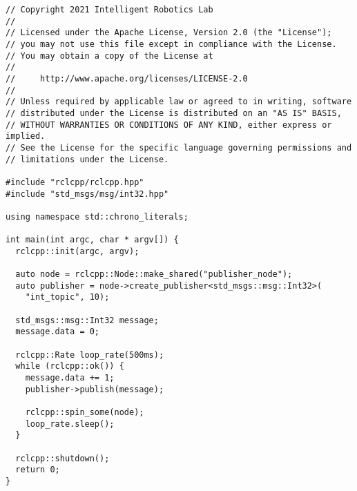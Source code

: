  \footnotesize
\begin{tcolorbox}[sharp corners, colframe=gray!80, colback=LightGray, left=0pt, top=0pt, bottom=0pt, title=\texttt{br2\_basics/src/publisher.cpp}]
  \begin{verbatim}
// Copyright 2021 Intelligent Robotics Lab
//
// Licensed under the Apache License, Version 2.0 (the "License");
// you may not use this file except in compliance with the License.
// You may obtain a copy of the License at
//
//     http://www.apache.org/licenses/LICENSE-2.0
//
// Unless required by applicable law or agreed to in writing, software
// distributed under the License is distributed on an "AS IS" BASIS,
// WITHOUT WARRANTIES OR CONDITIONS OF ANY KIND, either express or implied.
// See the License for the specific language governing permissions and
// limitations under the License.

#include "rclcpp/rclcpp.hpp"  
#include "std_msgs/msg/int32.hpp"

using namespace std::chrono_literals;

int main(int argc, char * argv[]) { 
  rclcpp::init(argc, argv);  

  auto node = rclcpp::Node::make_shared("publisher_node");  
  auto publisher = node->create_publisher<std_msgs::msg::Int32>(
    "int_topic", 10);

  std_msgs::msg::Int32 message;
  message.data = 0;

  rclcpp::Rate loop_rate(500ms);
  while (rclcpp::ok()) {
    message.data += 1;
    publisher->publish(message);

    rclcpp::spin_some(node);
    loop_rate.sleep();
  }

  rclcpp::shutdown();  
  return 0;  
}     \end{verbatim}
    \end{tcolorbox}
  \normalsize

